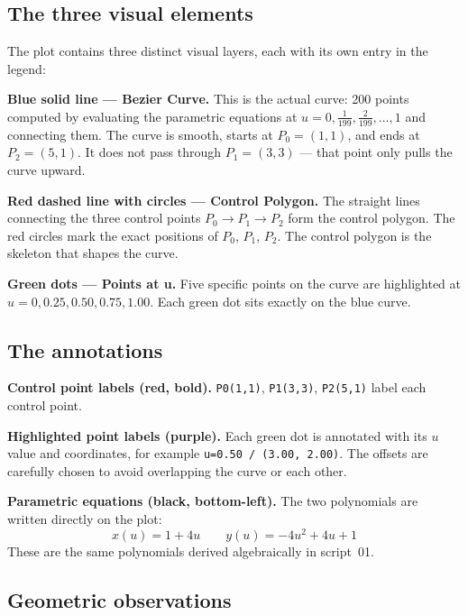 \documentclass[12pt, a4paper]{article}
\newcommand{\cd}[1]{\texttt{#1}}
\begin{document}
\subsection{The three visual elements}

The plot contains three distinct visual layers, each with its
own entry in the legend:

\textbf{Blue solid line --- Bezier Curve.}
This is the actual curve: 200 points computed by evaluating
the parametric equations at $u = 0, \tfrac{1}{199}, \tfrac{2}{199},
\ldots, 1$ and connecting them.
The curve is smooth, starts at $P_0 = (1,1)$, and ends at
$P_2 = (5,1)$.
It does not pass through $P_1 = (3,3)$ --- that point only
pulls the curve upward.

\textbf{Red dashed line with circles --- Control Polygon.}
The straight lines connecting the three control points
$P_0 \to P_1 \to P_2$ form the control polygon.
The red circles mark the exact positions of $P_0$, $P_1$, $P_2$.
The control polygon is the skeleton that shapes the curve.

\textbf{Green dots --- Points at u.}
Five specific points on the curve are highlighted at
$u = 0, 0.25, 0.50, 0.75, 1.00$.
Each green dot sits exactly on the blue curve.

\subsection{The annotations}

\textbf{Control point labels (red, bold).}
\cd{P0(1,1)}, \cd{P1(3,3)}, \cd{P2(5,1)} label each
control point.

\textbf{Highlighted point labels (purple).}
Each green dot is annotated with its $u$ value and
coordinates, for example \cd{u=0.50 / (3.00, 2.00)}.
The offsets are carefully chosen to avoid overlapping
the curve or each other.

\textbf{Parametric equations (black, bottom-left).}
The two polynomials are written directly on the plot:
\[
  x(u) = 1 + 4u \qquad y(u) = -4u^2 + 4u + 1
\]
These are the same polynomials derived algebraically in
script~01.

\subsection{Geometric observations}
\end{document}
